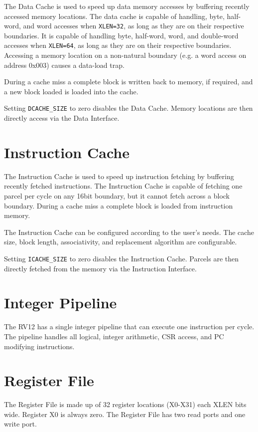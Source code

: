 The Data Cache is used to speed up data memory accesses by buffering
recently accessed memory locations. The data cache is capable of
handling, byte, half-word, and word accesses when \texttt{XLEN=32}, as long as
they are on their respective boundaries. It is capable of handling byte,
half-word, word, and double-word accesses when \texttt{XLEN=64}, as long as they
are on their respective boundaries. Accessing a memory location on a
non-natural boundary (e.g. a word access on address 0x003) causes a
data-load trap.

During a cache miss a complete block is written back to memory, if
required, and a new block loaded is loaded into the cache.

Setting \texttt{DCACHE\_SIZE} to zero disables the Data Cache. Memory locations
are then directly access via the Data Interface.

\section{Instruction Cache}\label{instruction-cache}

The Instruction Cache is used to speed up instruction fetching by
buffering recently fetched instructions. The Instruction Cache is
capable of fetching one parcel per cycle on any 16bit boundary, but it
cannot fetch across a block boundary. During a cache miss a complete
block is loaded from instruction memory.

The Instruction Cache can be configured according to the user's needs.
The cache size, block length, associativity, and replacement algorithm
are configurable.

Setting \texttt{ICACHE\_SIZE} to zero disables the Instruction Cache. Parcels are
then directly fetched from the memory via the Instruction Interface.

\section{Integer Pipeline}\label{integer-pipeline}

The RV12 has a single integer pipeline that can execute one instruction per cycle.
The pipeline handles all logical, integer arithmetic, CSR access, and PC
modifying instructions.


\section{Register File}\label{register-file}

The Register File is made up of 32 register locations (X0-X31) each XLEN
bits wide. Register X0 is always zero. The Register File has two read
ports and one write port.
